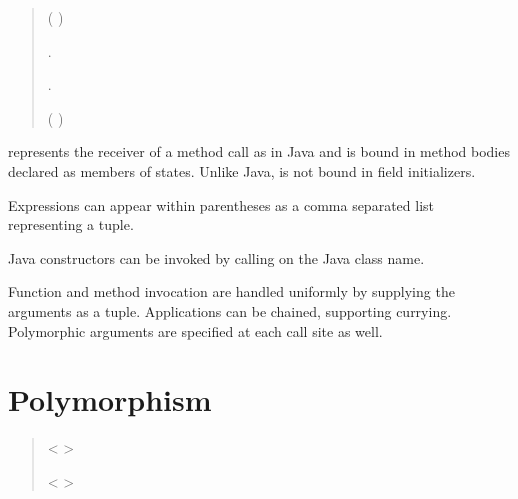 \begin{quote}


 {}

 {}

 {}

 (  ) 

 {} . 

 {} . 

 {}   


 {} 




 (   ) 

\end{quote}

 represents the receiver of a method call as in Java and is 
bound in method bodies declared as members of states.  Unlike Java,
 is not bound in field initializers.

Expressions can appear within parentheses as a comma
separated list representing a tuple.

Java constructors can be invoked by calling 
on the Java class name.

Function and method invocation are handled uniformly by
supplying the arguments as a tuple.  Applications can be
chained, supporting currying.  Polymorphic arguments
are specified at each call site as well.

\section{Polymorphism}
\label{sec:polymorphic}

\begin{quote}


 <   >


 {}  


 {}

 {}

 {}


 <   >

\end{quote}

